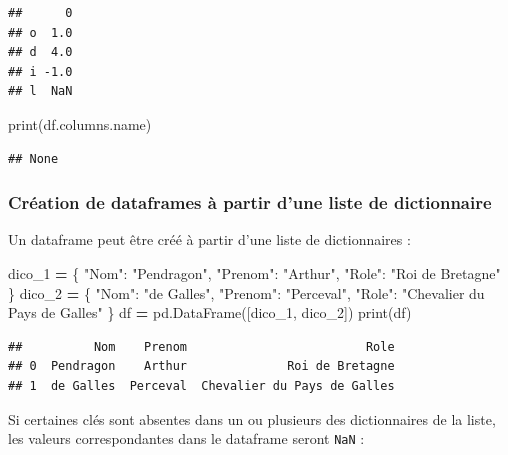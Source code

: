 \documentclass[12pt,]{book}
\newenvironment{Shaded}{\begin{snugshade}}{\end{snugshade}}
\newcommand{\StringTok}[1]{\textcolor[rgb]{0.31,0.60,0.02}{#1}}
\newcommand{\OperatorTok}[1]{\textcolor[rgb]{0.81,0.36,0.00}{\textbf{#1}}}
\newcommand{\BuiltInTok}[1]{#1}
\newcommand{\NormalTok}[1]{#1}
\numberwithin{equation}{section}
\numberwithin{countremarque}{section}
\begin{document}
\begin{lstlisting}
##      0
## o  1.0
## d  4.0
## i -1.0
## l  NaN
\end{lstlisting}

\begin{Shaded}
\begin{Highlighting}[]
\BuiltInTok{print}\NormalTok{(df.columns.name)}
\end{Highlighting}
\end{Shaded}

\begin{lstlisting}
## None
\end{lstlisting}

\subsubsection{Création de dataframes à partir d'une liste de
dictionnaire}\label{creation-de-dataframes-a-partir-dune-liste-de-dictionnaire}

Un dataframe peut être créé à partir d'une liste de dictionnaires :

\begin{Shaded}
\begin{Highlighting}[]
\NormalTok{dico_1 }\OperatorTok{=}\NormalTok{ \{}
    \StringTok{"Nom"}\NormalTok{: }\StringTok{"Pendragon"}\NormalTok{,}
    \StringTok{"Prenom"}\NormalTok{: }\StringTok{"Arthur"}\NormalTok{,}
    \StringTok{"Role"}\NormalTok{: }\StringTok{"Roi de Bretagne"}
\NormalTok{\}}
\NormalTok{dico_2 }\OperatorTok{=}\NormalTok{ \{}
    \StringTok{"Nom"}\NormalTok{: }\StringTok{"de Galles"}\NormalTok{,}
    \StringTok{"Prenom"}\NormalTok{: }\StringTok{"Perceval"}\NormalTok{,}
    \StringTok{"Role"}\NormalTok{: }\StringTok{"Chevalier du Pays de Galles"}
\NormalTok{\}}
\NormalTok{df }\OperatorTok{=}\NormalTok{ pd.DataFrame([dico_1, dico_2])}
\BuiltInTok{print}\NormalTok{(df)}
\end{Highlighting}
\end{Shaded}

\begin{lstlisting}
##          Nom    Prenom                         Role
## 0  Pendragon    Arthur              Roi de Bretagne
## 1  de Galles  Perceval  Chevalier du Pays de Galles
\end{lstlisting}

Si certaines clés sont absentes dans un ou plusieurs des dictionnaires
de la liste, les valeurs correspondantes dans le dataframe seront
\texttt{NaN} :
\end{document}
